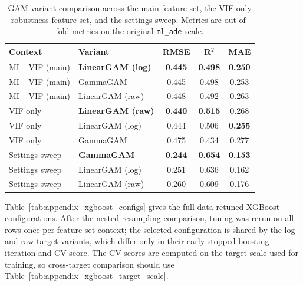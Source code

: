 \documentclass[12pt]{article}
\begin{document}
\begin{table}[H]
  \centering
  \caption[GAM variant comparison]{GAM variant comparison across the main feature set, the VIF-only robustness feature set, and the settings sweep. Metrics are out-of-fold metrics on the original \texttt{ml\_ade} scale.}
  \label{tab:appendix_gam_variant_contexts}
  \footnotesize
  \renewcommand{\arraystretch}{1.10}
  \begin{tabular}{llccc}
    \toprule
    \textbf{Context} & \textbf{Variant} & \textbf{RMSE} & \textbf{R$^2$} & \textbf{MAE} \\
    \midrule
    MI\,+\,VIF (main) & \textbf{LinearGAM (log)} & \textbf{0.445} & \textbf{0.498} & \textbf{0.250} \\
    MI\,+\,VIF (main) & GammaGAM & 0.445 & 0.498 & 0.253 \\
    MI\,+\,VIF (main) & LinearGAM (raw) & 0.448 & 0.492 & 0.263 \\
    \midrule
    VIF only & \textbf{LinearGAM (raw)} & \textbf{0.440} & \textbf{0.515} & 0.268 \\
    VIF only & LinearGAM (log) & 0.444 & 0.506 & \textbf{0.255} \\
    VIF only & GammaGAM & 0.475 & 0.434 & 0.277 \\
    \midrule
    Settings sweep & \textbf{GammaGAM} & \textbf{0.244} & \textbf{0.654} & \textbf{0.153} \\
    Settings sweep & LinearGAM (log) & 0.251 & 0.636 & 0.162 \\
    Settings sweep & LinearGAM (raw) & 0.260 & 0.609 & 0.176 \\
    \bottomrule
  \end{tabular}
\end{table}

Table~\ref{tab:appendix_xgboost_configs} gives the full-data retuned XGBoost configurations. After the nested-resampling comparison, tuning was rerun on all rows once per feature-set context; the selected configuration is shared by the log- and raw-target variants, which differ only in their early-stopped boosting iteration and CV score. The CV scores are computed on the target scale used for training, so cross-target comparison should use Table~\ref{tab:appendix_xgboost_target_scale}.
\end{document}
